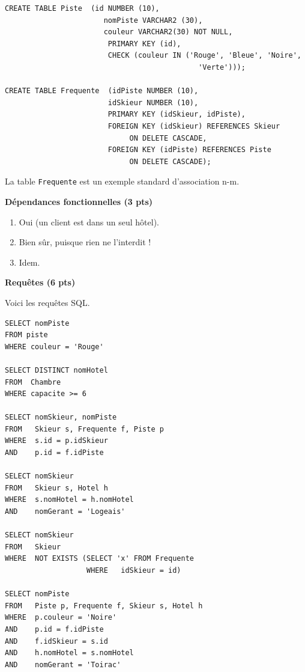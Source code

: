 \documentclass{article}
\begin{document}
\begin{verbatim}
CREATE TABLE Piste  (id NUMBER (10),
                       nomPiste VARCHAR2 (30),
                       couleur VARCHAR2(30) NOT NULL,
                        PRIMARY KEY (id),
                        CHECK (couleur IN ('Rouge', 'Bleue', 'Noire',
                                             'Verte')));

CREATE TABLE Frequente  (idPiste NUMBER (10),
                        idSkieur NUMBER (10),
                        PRIMARY KEY (idSkieur, idPiste),
                        FOREIGN KEY (idSkieur) REFERENCES Skieur
                             ON DELETE CASCADE,
                        FOREIGN KEY (idPiste) REFERENCES Piste
                             ON DELETE CASCADE);
\end{verbatim}

La table {\tt Frequente} est un exemple standard
d'association n-m.

\smallskip
{\bf D\'ependances fonctionnelles (3 pts)}


\begin{enumerate}
   \item Oui (un client est dans un seul h\^otel).

    \item Bien s\^ur, puisque rien ne l'interdit !

    \item Idem.

\end{enumerate}


\smallskip
{\bf Requ\^etes ({\bf 6 pts})}

Voici les requ\^etes SQL.

\begin{verbatim}
SELECT nomPiste 
FROM piste 
WHERE couleur = 'Rouge'

SELECT DISTINCT nomHotel 
FROM  Chambre
WHERE capacite >= 6

SELECT nomSkieur, nomPiste
FROM   Skieur s, Frequente f, Piste p
WHERE  s.id = p.idSkieur
AND    p.id = f.idPiste

SELECT nomSkieur
FROM   Skieur s, Hotel h
WHERE  s.nomHotel = h.nomHotel
AND    nomGerant = 'Logeais'

SELECT nomSkieur
FROM   Skieur
WHERE  NOT EXISTS (SELECT 'x' FROM Frequente
                   WHERE   idSkieur = id)

SELECT nomPiste
FROM   Piste p, Frequente f, Skieur s, Hotel h
WHERE  p.couleur = 'Noire'
AND    p.id = f.idPiste
AND    f.idSkieur = s.id
AND    h.nomHotel = s.nomHotel
AND    nomGerant = 'Toirac'
\end{verbatim}
\end{document}
